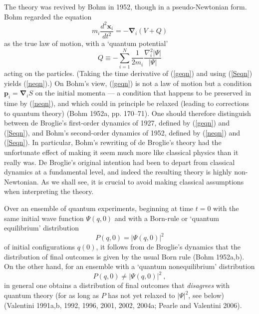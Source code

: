 \documentclass[12pt]{article}%
\begin{document}
The theory was revived by Bohm in 1952, though in a pseudo-Newtonian form.
Bohm regarded the equation%
\begin{equation}
m_{i}\frac{d^{2}\mathbf{x}_{i}}{dt^{2}}=-\mathbf{\nabla}_{i}(V+Q) \label{neqn}%
\end{equation}
as the true law of motion, with a `quantum potential'%
\[
Q\equiv-\sum_{i=1}^{N}\frac{1}{2m_{i}}\frac{\nabla_{i}^{2}\left\vert
\Psi\right\vert }{\left\vert \Psi\right\vert }%
\]
acting on the particles. (Taking the time derivative of (\ref{geqn}) and using
(\ref{Seqn}) yields (\ref{neqn}).) On Bohm's view, (\ref{geqn}) is not a law
of motion but a condition $\mathbf{p}_{i}=\mathbf{\nabla}_{i}S$ on the initial
momenta --- a condition that happens to be preserved in time by (\ref{neqn}),
and which could in principle be relaxed (leading to corrections to quantum
theory) (Bohm 1952a, pp. 170--71). One should therefore distinguish between de
Broglie's first-order dynamics of 1927, defined by (\ref{geqn}) and
(\ref{Seqn}), and Bohm's second-order dynamics of 1952, defined by
(\ref{neqn}) and (\ref{Seqn}). In particular, Bohm's rewriting of de Broglie's
theory had the unfortunate effect of making it seem much more like classical
physics than it really was. De Broglie's original intention had been to depart
from classical dynamics at a fundamental level, and indeed the resulting
theory is highly non-Newtonian. As we shall see, it is crucial to avoid making
classical assumptions when interpreting the theory.

Over an ensemble of quantum experiments, beginning at time $t=0$ with the same
initial wave function $\Psi(q,0)$ and with a Born-rule or `quantum
equilibrium' distribution%
\begin{equation}
P(q,0)=\left\vert \Psi(q,0)\right\vert ^{2} \label{Br}%
\end{equation}
of initial configurations $q(0)$, it follows from de Broglie's dynamics that
the distribution of final outcomes is given by the usual Born rule (Bohm
1952a,b). On the other hand, for an ensemble with a `quantum nonequilibrium'
distribution%
\begin{equation}
P(q,0)\neq\left\vert \Psi(q,0)\right\vert ^{2}\ , \label{notBr}%
\end{equation}
in general one obtains a distribution of final outcomes that
\textit{disagrees} with quantum theory (for as long as $P$ has not yet relaxed
to $|\Psi|^{2}$, see below) (Valentini 1991a,b, 1992, 1996, 2001, 2002, 2004a;
Pearle and Valentini 2006).
\end{document}
